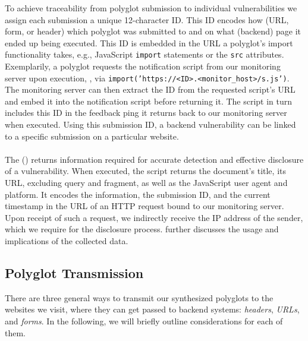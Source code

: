 To achieve traceability from polyglot submission to individual vulnerabilities we assign each submission a unique \num{12}-character ID\@.
This ID encodes how (URL, form, or header) which polyglot was submitted to and on what (backend) page it ended up being executed.
This ID is embedded in the URL a polyglot's import functionality takes, e.g., JavaScript \texttt{import} statements or the \texttt{src} attributes.
Exemplarily, a polyglot requests the notification script from our monitoring server upon execution, \eg, via \texttt{import('https://<ID>.<monitor_host>/s.js')}.
The monitoring server can then extract the ID from the requested script's URL and embed it into the notification script before returning it.
The script in turn includes this ID in the feedback ping it returns back to our monitoring server when executed.
Using this submission ID, a backend vulnerability can be linked to a specific submission on a particular website.




\vspace{-1em}\paragraph{\Ourscriptname{}} The \ourscriptname{} () returns information required for accurate detection and effective disclosure of a \blindxss{} vulnerability.
When executed, the script returns the document's title, its URL, excluding query and fragment, as well as the JavaScript user agent and platform.
It encodes the information, the submission ID, and the current timestamp in the URL of an HTTP request bound to our monitoring server.
Upon receipt of such a request, we indirectly receive the IP address of the sender, which we require for the disclosure process. 
 further discusses the usage and implications of the collected data. %

\pagebreak
\subsection{Polyglot Transmission}%
\label{sec:polyglot-transmission}


There are three general ways to transmit our synthesized polyglots to the websites we visit, where they can get passed to backend systems: \emph{headers}, \emph{URLs}, and \emph{forms}.
In the following, we will briefly outline considerations for each of them.

